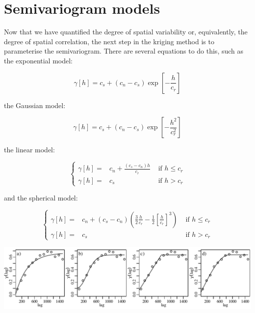 \section{Semivariogram models}
\label{sec:semivariogram-models}

Now that we have quantified the degree of spatial variability or,
equivalently, the degree of spatial correlation, the next step in the
kriging method is to parameterise the semivariogram. There are several
equations to do this, such as the exponential model:

\begin{equation}
  \gamma[h] = c_s + (c_n-c_s) \exp\left[-\frac{h}{c_r}\right]
  \label{eq:semivariogramexponential}
\end{equation}

\noindent the Gaussian model:

\begin{equation}
  \gamma[h] = c_s + (c_n-c_s) \exp\left[-\frac{h^2}{c_r^2}\right]
  \label{eq:semivariogramgaussian}
\end{equation}

\noindent the linear model:

\begin{equation}
  \left\{
  \begin{aligned}
  \gamma[h] = & c_n + \frac{(c_s-c_n) h}{c_r} & \mbox{~if~}{h}\leq{c_r}\\
    \gamma[h] = & c_s & \mbox{~if~} h>c_r 
  \end{aligned}
  \right.
    \label{eq:semivariogramlinear}
\end{equation}

\noindent and the spherical model:

\begin{equation}
  \left\{
  \begin{aligned}
    \gamma[h] = & c_n + (c_s-c_n)
    \left(\frac{3}{2}\frac{h}{c_r} -
    \frac{1}{2}\left[\frac{h}{c_r}\right]^3\right)
    & \mbox{~if~}{h}\leq{c_r}\\
    \gamma[h] = & c_s & \mbox{~if~} h>c_r
  \end{aligned}
  \right.
  \label{eq:semivariogramspherical}
\end{equation}

\noindent
\includegraphics[width=\textwidth]{../figures/semivariogramfit.pdf}
\begingroup {}
\label{fig:semivariogramfit}
\endgroup

